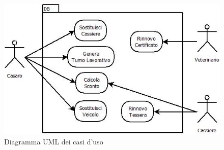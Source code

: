 \documentclass[12pt]{report}
\begin{document}
\begin{figure}[H]
\centering
\includegraphics[scale=1]{imgs/UML/UML.jpeg}
\caption{Diagramma UML dei casi d'uso}
\end{figure}
\end{document}
